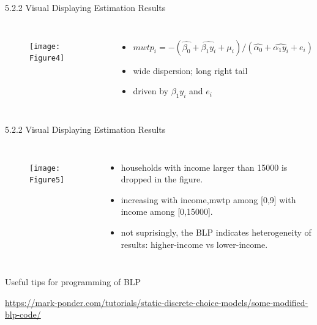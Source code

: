 \documentclass[10pt]{beamer}
\begin{document}
\begin{frame}{5.2.2 Visual Displaying Estimation Results}
    \begin{columns}[c] 
    \column{9cm}
    \begin{figure}
        \centering
        \texttt{[image: Figure4]}
    \end{figure}
    \column{4cm}
    \begin{itemize}
        \item $mwtp_i = -(\hat{\beta_0}+\hat{\beta_1 y_i}+\mu_i)/(\hat{\alpha_0}+\hat{\alpha_1 y_i}+e_i)$
        \item wide dispersion; long right tail
        \item driven by $\beta_1 y_i$ and $e_i$
    \end{itemize}
	\end{columns}
\end{frame}
\begin{frame}{5.2.2 Visual Displaying Estimation Results}
    \begin{columns}[c] 
    \column{9cm}
    \begin{figure}
        \centering
        \texttt{[image: Figure5]}
    \end{figure}
    \column{4cm}
    \begin{itemize}
        \item households with income larger than 15000 is dropped in the figure.
        \item increasing with income,mwtp among [0,9] with income among [0,15000].
        \item not suprisingly, the BLP indicates heterogeneity of results: higher-income vs lower-income.
    \end{itemize}
	\end{columns}
\end{frame}
\begin{frame}{Useful tips for programming of BLP}
    \item \url{https://mark-ponder.com/tutorials/static-discrete-choice-models/some-modified-blp-code/}
\end{frame}
\end{document}
